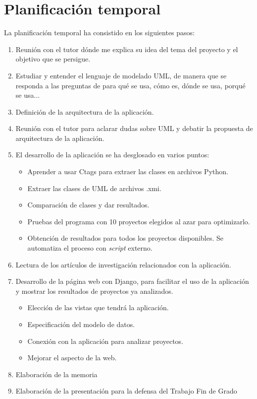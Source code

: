 \documentclass[a4paper, 12pt]{book}
\begin{document}
\section{Planificación temporal}
\label{sec:planificacion-temporal}

La planificación temporal ha consistido en los siguientes pasos:


\begin{enumerate}
  \item Reunión con el tutor dónde me explica su idea del tema del proyecto y el objetivo que se persigue.
  \item Estudiar y entender el lenguaje de modelado UML, de manera que se responda a las preguntas de para qué se usa, cómo es, dónde se usa, porqué se usa...
  \item Definición de la arquitectura de la aplicación.
  \item Reunión con el tutor para aclarar dudas sobre UML y debatir la propuesta de arquitectura de la aplicación.
  \item El desarrollo de la aplicación se ha desglosado en varios puntos:
  \begin{itemize}
    \item Aprender a usar Ctags para extraer las clases en archivos Python.
    \item Extraer las clases de UML de archivos .xmi.
    \item Comparación de clases y dar resultados.
    \item Pruebas del programa con 10 proyectos elegidos al azar para optimizarlo.
    \item Obtención de resultados para todos los proyectos disponibles. Se automatiza el proceso con \emph{script} externo.
  \end{itemize}
  \item Lectura de los artículos de investigación relacionados con la aplicación.
  \item Desarrollo de la página web con Django, para facilitar el uso de la aplicación y mostrar los resultados de proyectos ya analizados.
  \begin{itemize}
    \item Elección de las vistas que tendrá la aplicación.
    \item Especificación del modelo de datos.
    \item Conexión con la aplicación para analizar proyectos.
    \item Mejorar el aspecto de la web.
  \end{itemize}
  \item Elaboración de la memoria
  \item Elaboración de la presentación para la defensa del Trabajo Fin de Grado
\end{enumerate}
\end{document}
